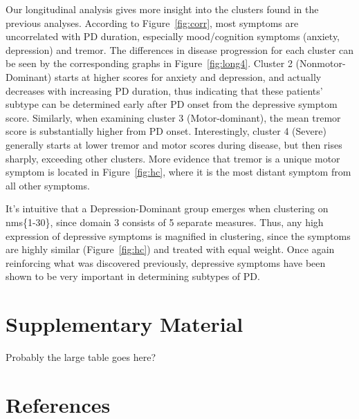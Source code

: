 \documentclass[preprint,5p]{elsarticle} %
\begin{document}

Our longitudinal analysis gives more insight into the clusters found in the previous analyses.
According to Figure~\ref{fig:corr}, most symptoms are uncorrelated with PD duration, especially
mood/cognition symptoms (anxiety, depression) and tremor.
The differences in disease progression for each cluster can be seen by the corresponding graphs in
Figure~\ref{fig:long4}. Cluster 2 (Nonmotor-Dominant) starts at higher
scores for anxiety and depression, and actually decreases with increasing PD duration, thus indicating that these patients' subtype can be determined
early after PD onset from the depressive symptom score. Similarly, when examining cluster 3
(Motor-dominant), the mean tremor score is substantially higher from PD onset.
Interestingly, cluster 4 (Severe) generally starts at lower tremor and motor scores during disease,
but then rises sharply, exceeding other clusters. More evidence that tremor is a unique motor
symptom is located in Figure~\ref{fig:hc}, where it is the most distant symptom from all other
symptoms.



It's intuitive that a Depression-Dominant group emerges when clustering on nms\{1-30\}, since
domain 3 consists of 5 separate measures. Thus, any high expression of depressive symptoms is
magnified in clustering, since the symptoms are highly similar (Figure~\ref{fig:hc}) and
treated with equal weight. Once again reinforcing what was discovered previously, depressive
symptoms have been shown to be very important in determining subtypes of PD.

\section{Supplementary Material}

Probably the large table goes here?

\section{References}


\end{document}
